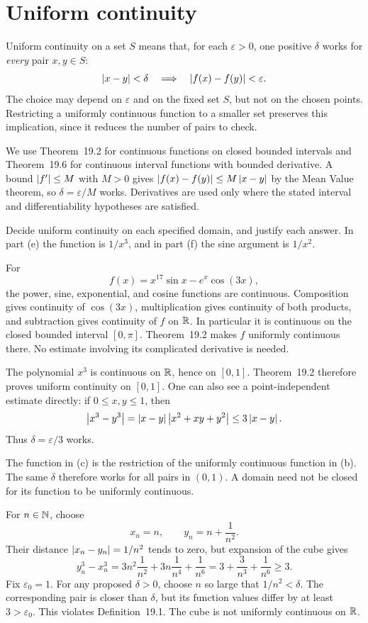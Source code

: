 \section{Uniform continuity}
\label{sec:uniform-continuity}
Uniform continuity on a set $S$ means that, for each $\varepsilon>0$,
one positive $\delta$ works for \emph{every} pair $x,y\in S$:
\[
 \left|x-y\right|<\delta\quad\Longrightarrow\quad
 \left|f(x)-f(y)\right|<\varepsilon.
\]
The choice may depend on $\varepsilon$ and on the fixed set $S$,
but not on the chosen points. Restricting a uniformly continuous
function to a smaller set preserves this implication, since it
reduces the number of pairs to check.

We use Theorem~19.2 for continuous functions on closed bounded
intervals and Theorem~19.6 for continuous interval functions with
bounded derivative. A bound $\left|f'\right|\le M$ with $M>0$ gives
$\left|f(x)-f(y)\right|\le M\left|x-y\right|$ by the Mean Value theorem, so
$\delta=\varepsilon/M$ works. Derivatives are used only where
the stated interval and differentiability hypotheses are satisfied.

\goal Decide uniform continuity on each specified domain, and justify
each answer. In part (e) the function is $1/x^3$, and in part (f)
the sine argument is $1/x^2$.

For
\[
 f(x)=x^{17}\sin x-e^x\cos(3x),
\]
the power, sine, exponential, and cosine functions are continuous.
Composition gives continuity of $\cos(3x)$, multiplication gives
continuity of both products, and subtraction gives continuity of
$f$ on $\mathbb{R}$. In particular it is continuous on the closed bounded
interval $[0,\pi]$. Theorem~19.2 makes $f$ uniformly continuous
there. No estimate involving its complicated derivative is needed.

The polynomial $x^3$ is continuous on $\mathbb{R}$, hence on $[0,1]$.
Theorem~19.2 therefore proves uniform continuity on $[0,1]$.
One can also see a point-independent estimate directly: if
$0\le x,y\le1$, then
\[
 \left|x^3-y^3\right|
 =\left|x-y\right|\left|x^2+xy+y^2\right|\le3\left|x-y\right|.
\]
Thus $\delta=\varepsilon/3$ works.

The function in (c) is the restriction of the uniformly continuous
function in (b). The same $\delta$ therefore works for all pairs
in $(0,1)$. A domain need not be closed for its function to be
uniformly continuous.

For $n\in\mathbb{N}$, choose
\[
 x_n=n,\qquad y_n=n+\frac1{n^2}.
\]
Their distance $\left|x_n-y_n\right|=1/n^2$ tends to zero, but expansion
of the cube gives
\[
 y_n^3-x_n^3
 =3n^2\frac1{n^2}+3n\frac1{n^4}+\frac1{n^6}
 =3+\frac3{n^3}+\frac1{n^6}\ge3.
\]
Fix $\varepsilon_0=1$. For any proposed $\delta>0$, choose
$n$ so large that $1/n^2<\delta$. The corresponding pair is
closer than $\delta$, but its function values differ by at least
$3>\varepsilon_0$. This violates Definition~19.1. The cube is
not uniformly continuous on $\mathbb{R}$.

